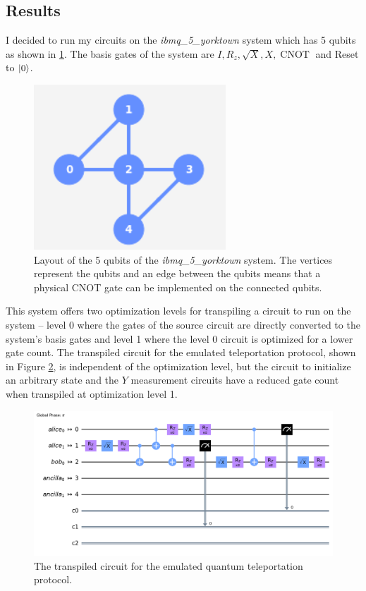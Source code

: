 \documentclass[prx,twocolumn]{revtex4-2}
\numberwithin{equation}{section}
\numberwithin{figure}{section}
\numberwithin{table}{section}
\DeclareMathOperator{\CNOT}{CNOT}
\begin{document}
\subsection{Results}
I decided to run my circuits on the \textit{ibmq\_5\_yorktown} system which has 5 qubits as shown in 
\ref{fig:qubit-layout}. The basis gates of the system are $I, R_z, \sqrt{X}, X, \CNOT$ and Reset to $\ket0$.
\begin{figure}
    \centering
    \includegraphics{images/qubit-architecture.png}
    \caption{Layout of the 5 qubits of the \textit{ibmq\_5\_yorktown} system. The vertices represent the qubits 
    and an edge between the qubits means that a physical CNOT gate can be implemented on the connected qubits.}
    \label{fig:qubit-layout}
\end{figure}

This system offers two optimization levels for transpiling a circuit to run on the system -- level 0 where 
the gates of the source circuit are directly converted to the system's basis gates and level 1 where the 
level 0 circuit is optimized for a lower gate count. The transpiled circuit for the emulated teleportation
protocol, shown in Figure \ref{fig:transpiled-circuits}, is independent of the optimization level, but the
circuit to initialize an arbitrary state and the $Y$ measurement circuits have a reduced gate count when 
transpiled at optimization level 1.

\begin{figure}
    \centering
    \includegraphics[width=\textwidth]{images/teleport_circ_opt_0.png}
    \caption{The transpiled circuit for the emulated quantum teleportation protocol.}
    \label{fig:transpiled-circuits}
\end{figure}
\end{document}
